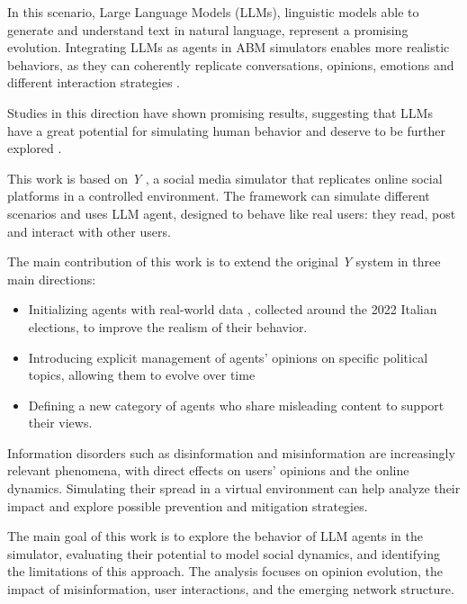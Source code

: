 In this scenario, Large Language Models (LLMs), linguistic models able to generate and understand text in natural language, represent a promising evolution.
Integrating LLMs as agents in ABM simulators enables more realistic behaviors, as they can coherently replicate conversations, opinions, emotions and different interaction strategies \cite{park2023genagents}.

Studies in this direction have shown promising results, suggesting that LLMs have a great potential for simulating human behavior and deserve to be further explored \cite{gao2023s3socialnetworksimulationlarge, törnberg2023evaluate, rossetti2024ysocialllmpoweredsocial}.


\medskip
This work is based on \textit{Y} \cite{rossetti2024ysocialllmpoweredsocial}, a social media simulator that replicates online social platforms in a controlled environment.
The framework can simulate different scenarios and uses LLM agent, designed to behave like real users: they read, post and interact with other users.

The main contribution of this work is to extend the original \textit{Y} system in three main directions:
\begin{itemize}
    \item Initializing agents with real-world data \cite{pierri2023ita}, collected around the 2022 Italian elections, to improve the realism of their behavior.
    \item Introducing explicit management of agents' opinions on specific political topics, allowing them to evolve over time
    \item Defining a new category of agents who share misleading content to support their views.
\end{itemize}

Information disorders such as disinformation and misinformation are increasingly relevant phenomena, with direct effects on users' opinions and the online dynamics.
Simulating their spread in a virtual environment can help analyze their impact and explore possible prevention and mitigation strategies.

The main goal of this work is to explore the behavior of LLM agents in the simulator, evaluating their potential to model social dynamics, and identifying the limitations of this approach.
The analysis focuses on opinion evolution, the impact of misinformation, user interactions, and the emerging network structure.





